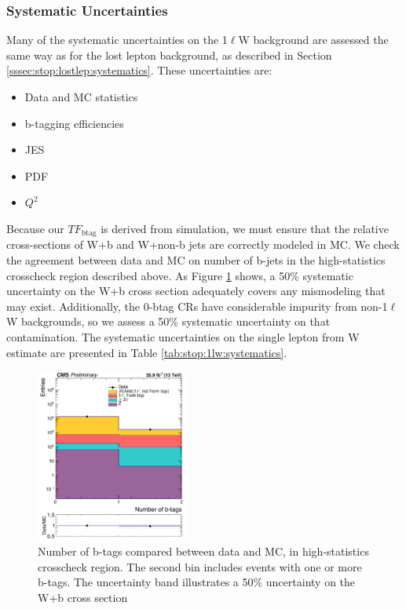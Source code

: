 \subsubsection{Systematic Uncertainties}
\label{sssec:stop:1lw:systematics}

Many of the systematic uncertainties on the 1$\ell$W background are
assessed the same way as for the lost lepton background, as described
in Section \ref{sssec:stop:lostlep:systematics}. These uncertainties
are:
\begin{itemize}
\item Data and MC statistics
\item b-tagging efficiencies
\item JES
\item PDF
\item $Q^2$
\end{itemize}

Because our $TF_\text{btag}$ is derived from simulation, we must ensure that
the relative cross-sections of W+b and W+non-b jets are correctly
modeled in MC. We check the agreement between data and MC on number of
b-jets in the high-statistics crosscheck region described above. As
Figure \ref{fig:stop:1lw:wb} shows, a 50\% systematic uncertainty on
the W+b cross section adequately covers any mismodeling that may
exist. Additionally, the 0-btag CRs have considerable impurity from
non-1$\ell$W backgrounds, so we assess a 50\% systematic uncertainty on
that contamination. The systematic uncertainties on the single lepton
from W estimate are presented in Table \ref{tab:stop:1lw:systematics}.

\begin{figure}[htb]
\centering
\includegraphics[width=0.45\textwidth]{figures/cr0b_nbtags_crosscheck.pdf}
\caption{Number of b-tags compared between data and MC, in
  high-statistics crosscheck region. The second bin includes events
  with one or more b-tags. The uncertainty band illustrates a 50\%
  uncertainty on the W+b cross section}
\label{fig:stop:1lw:wb}
\end{figure}

